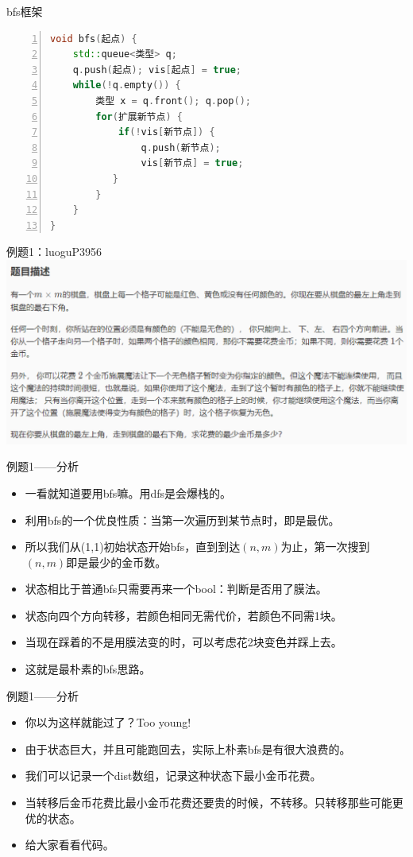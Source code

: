 \documentclass{bemaer}[UTF-8]
\begin{document}
\begin{frame}{bfs框架}
\begin{lstlisting}[language = C++, numbers=left,
numberstyle=\tiny,keywordstyle=\color{blue!70},
commentstyle=\color{red!50!green!50!blue!50},frame=shadowbox,
rulesepcolor=\color{red!20!green!20!blue!20},basicstyle=\ttfamily]
void bfs(起点) {
    std::queue<类型> q;
    q.push(起点); vis[起点] = true;
    while(!q.empty()) {
        类型 x = q.front(); q.pop();
        for(扩展新节点) {
            if(!vis[新节点]) {
                q.push(新节点);
                vis[新节点] = true;
           }
        }
    }
}
\end{lstlisting}
\end{frame}

\begin{frame}{例题1：luoguP3956}
\includegraphics{luoguP3956.png}
\end{frame}

\begin{frame}{例题1——分析}
\begin{itemize}
\item 一看就知道要用bfs嘛。用dfs是会爆栈的。
\item 利用bfs的一个优良性质：当第一次遍历到某节点时，即是最优。
\item 所以我们从(1,1)初始状态开始bfs，直到到达$(n,m)$为止，第一次搜到$(n,m)$即是最少的金币数。
\item 状态相比于普通bfs只需要再来一个bool：判断是否用了膜法。
\item 状态向四个方向转移，若颜色相同无需代价，若颜色不同需1块。
\item 当现在踩着的不是用膜法变的时，可以考虑花2块变色并踩上去。
\item 这就是最朴素的bfs思路。
\end{itemize}
\end{frame}

\begin{frame}{例题1——分析}
\begin{itemize}
\item 你以为这样就能过了？Too young!
\item 由于状态巨大，并且可能跑回去，实际上朴素bfs是有很大浪费的。
\item 我们可以记录一个dist数组，记录这种状态下最小金币花费。
\item 当转移后金币花费比最小金币花费还要贵的时候，不转移。只转移那些可能更优的状态。
\item 给大家看看代码。
\end{itemize}
\end{frame}
\end{document}
